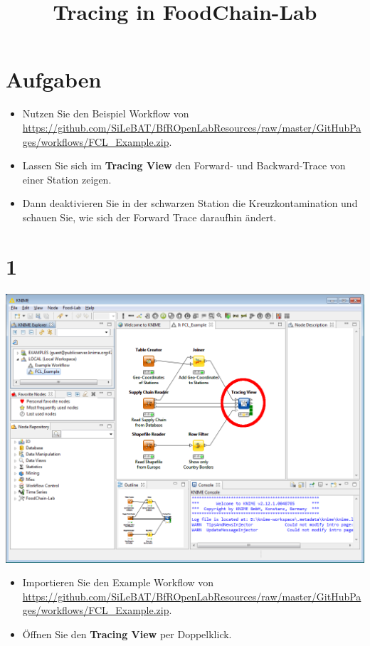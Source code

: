 \documentclass{beamer}
\title{Tracing in FoodChain-Lab}
\date{}
\begin{document}
\maketitle

\section{Aufgaben}
\begin{frame}
	\begin{itemize}
		\item Nutzen Sie den Beispiel Workflow von \url{https://github.com/SiLeBAT/BfROpenLabResources/raw/master/GitHubPages/workflows/FCL_Example.zip}.
		\item Lassen Sie sich im \textbf{Tracing View} den Forward- und Backward-Trace von einer Station zeigen.
		\item Dann deaktivieren Sie in der schwarzen Station die Kreuzkontamination und schauen Sie, wie sich der Forward Trace daraufhin ändert.
	\end{itemize}
\end{frame}
 
\section{1}
\begin{frame}
	\begin{center}
  		\includegraphics[height=0.6\textheight]{1.png}
	\end{center}
	\begin{itemize}
		\item Importieren Sie den Example Workflow von \url{https://github.com/SiLeBAT/BfROpenLabResources/raw/master/GitHubPages/workflows/FCL_Example.zip}.
		\item Öffnen Sie den \textbf{Tracing View} per Doppelklick.
	\end{itemize}
\end{frame}
\end{document}
